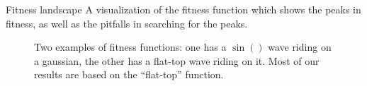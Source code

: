 \documentclass[handout,10pt,aspectratio=169]{beamer}
\begin{document}
\begin{frame}{Fitness landscape}
  A visualization of the fitness function which
  shows the peaks in fitness, as well as the pitfalls in searching for
  the peaks.
  \begin{figure}
    \centering
    \caption{Two examples of fitness functions: one has a $\sin()$ wave
      riding on a gaussian, the other has a flat-top wave riding on it.
      Most of our results are based on the ``flat-top'' function.}
    \label{fig:fit-func_pid3095791}
  \end{figure}
\end{frame}
\end{document}
